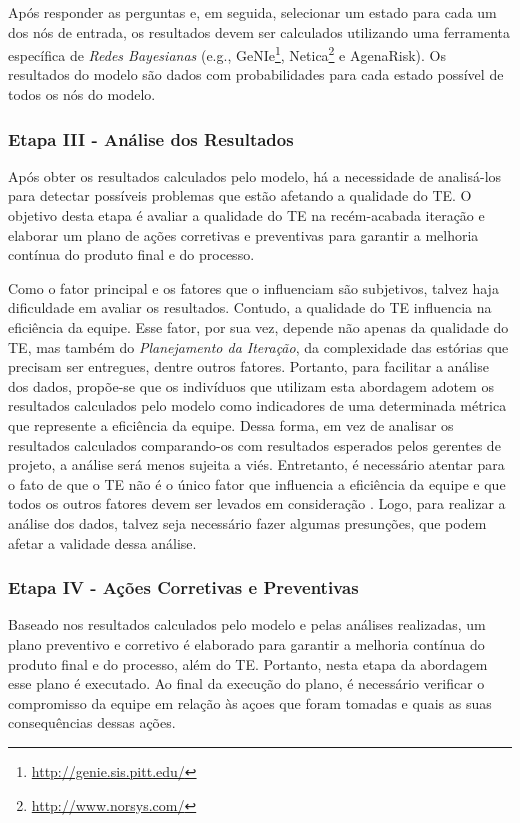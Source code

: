 Após responder as perguntas e, em seguida, selecionar um estado para cada um dos nós de entrada, os resultados devem ser calculados utilizando uma ferramenta específica de \textit{Redes Bayesianas} (e.g., GeNIe\footnote{\url{http://genie.sis.pitt.edu/}}, Netica\footnote{\url{http://www.norsys.com/}} e AgenaRisk). Os resultados do modelo são dados com probabilidades para cada estado possível de todos os nós do modelo.

\subsubsection{Etapa III - Análise dos Resultados}
\label{descricao:analise}

Após obter os resultados calculados pelo modelo, há a necessidade de analisá-los para detectar possíveis problemas que estão afetando a qualidade do TE. O objetivo desta etapa é avaliar a qualidade do TE na recém-acabada iteração e elaborar um plano de ações corretivas e preventivas para garantir a melhoria contínua do produto final e do processo.

Como o fator principal e os fatores que o influenciam são subjetivos, talvez haja dificuldade em avaliar os resultados. Contudo, a qualidade do TE influencia na eficiência da equipe. Esse fator, por sua vez, depende não apenas da qualidade do TE, mas também do \textit{Planejamento da Iteração}, da complexidade das estórias que precisam ser entregues, dentre outros fatores. Portanto, para facilitar a análise dos dados, propõe-se que os indivíduos que utilizam esta abordagem adotem os resultados calculados pelo modelo como indicadores de uma determinada métrica que represente a eficiência da equipe. Dessa forma, em vez de analisar os resultados calculados comparando-os com resultados esperados pelos gerentes de projeto, a análise será menos sujeita a viés. Entretanto, é necessário atentar para o fato de que o TE não é o único fator que influencia a eficiência da equipe e que todos os outros fatores devem ser levados em consideração . Logo, para realizar a análise dos dados, talvez seja necessário fazer algumas presunções, que podem afetar a validade dessa análise.


\subsubsection{Etapa IV - Ações Corretivas e Preventivas}
\label{descricao:acoes}

Baseado nos resultados calculados pelo modelo e pelas análises realizadas, um plano preventivo e corretivo é elaborado para garantir a melhoria contínua do produto final e do processo, além do TE. Portanto, nesta etapa da abordagem esse plano é executado. Ao final da execução do plano, é necessário verificar o compromisso da equipe em relação às açoes que foram tomadas e quais as suas consequências dessas ações.
